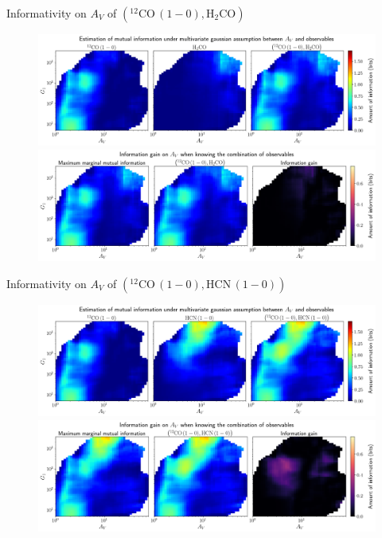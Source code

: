 \documentclass{beamer}
\begin{document}
\begin{frame}{Informativity on $A_V$ of $\left(\mathrm{^{12}CO\,(1-0)},\mathrm{H_2CO}\right)$}
    \begin{figure}
        \centering
        \includegraphics[width=0.95\linewidth]{../linearinfogauss/av__12co10_h2co_linearinfogauss.png}
        \vfill
        \includegraphics[width=0.95\linewidth]{../linearinfogauss/av__12co10_h2co_linearinfogauss_gain.png}
    \end{figure}
\end{frame}

\begin{frame}{Informativity on $A_V$ of $\left(\mathrm{^{12}CO\,(1-0)},\mathrm{HCN\,(1-0)}\right)$}
    \begin{figure}
        \centering
        \includegraphics[width=0.95\linewidth]{../linearinfogauss/av__12co10_hcn10_linearinfogauss.png}
        \vfill
        \includegraphics[width=0.95\linewidth]{../linearinfogauss/av__12co10_hcn10_linearinfogauss_gain.png}
    \end{figure}
\end{frame}
\end{document}
